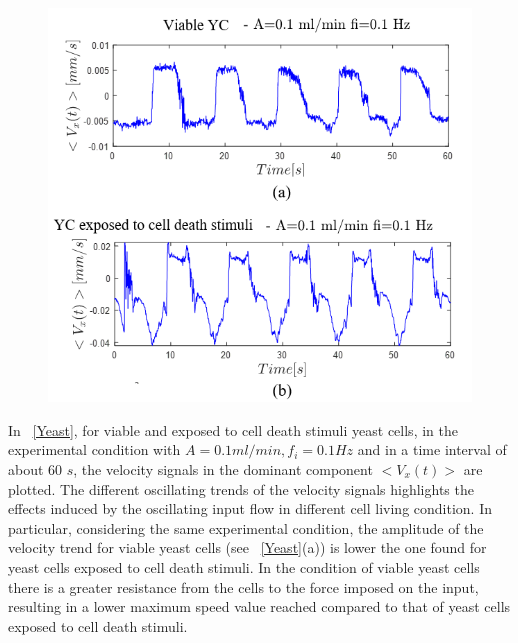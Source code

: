 \documentclass[journal]{IEEEtran}
\theoremstyle{definition}
\theoremstyle{remark}
\begin{document}
\begin{figure}[t]
	\centering
	\includegraphics[width=1\columnwidth]{images/Yeast}
\end{figure}

In ~\fig\ref{Yeast}, for viable and exposed to cell death stimuli yeast cells, in the experimental condition with {$A=0.1 ml/min, f_i= 0.1 Hz$} and in a time interval of about 60 $s$, the velocity signals in the dominant component  $<V_x(t)>$ are plotted. The different oscillating trends of the velocity signals highlights the effects induced by the oscillating input flow in different cell living condition. In particular, considering the same experimental condition, the amplitude of the velocity trend for viable yeast cells (see ~\fig\ref{Yeast}(a)) is lower the one found for yeast cells exposed to cell death stimuli. 
In the condition of viable yeast cells there is a greater resistance from the cells to the force imposed on the input, resulting in a lower maximum speed value reached compared to that of yeast cells exposed to cell death stimuli.
\end{document}
